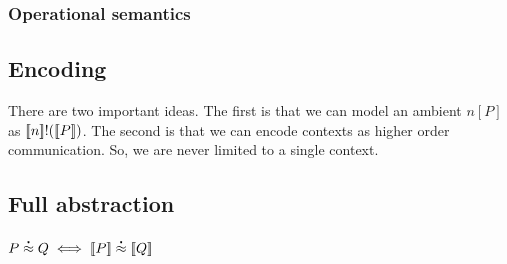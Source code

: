 \subsubsection{Operational semantics}

\subsection{Encoding}
There are two important ideas. The first is that we can model an
ambient $n[P]$ as $[\![ n ]\!]\mathsf{!}([\![ P ]\!])$. The second
is that we can encode contexts as higher order communication. So, we
are never limited to a single context.

\subsection{Full abstraction}
\begin{theorem}
  $P \stackrel{\centerdot}{\approx} Q \iff [\![ P ]\!] \stackrel{\centerdot}{\approx} [\![ Q ]\!]$
\end{theorem}


